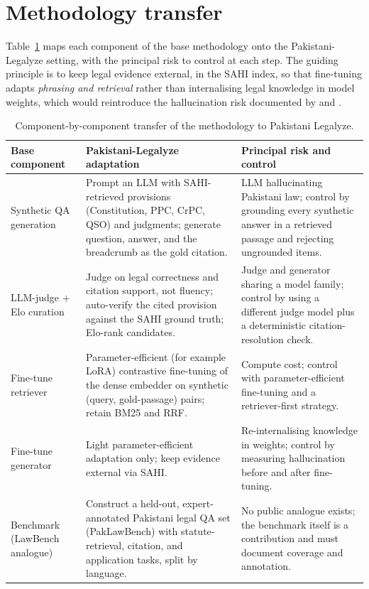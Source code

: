\documentclass[10pt,twocolumn]{article}
\renewcommand{\arraystretch}{1.25}
\begin{document}
\section{Methodology transfer}
\label{sec:rd-method}

Table~\ref{tab:rd-transfer} maps each component of the base methodology onto the Pakistani-Legalyze
setting, with the principal risk to control at each step. The guiding principle is to keep legal
evidence external, in the SAHI index, so that fine-tuning adapts \emph{phrasing and retrieval} rather
than internalising legal knowledge in model weights, which would reintroduce the hallucination risk
documented by \citet{dahl2024} and \citet{magesh2025}.

\begin{table}[t]
\centering
\caption{Component-by-component transfer of the \citet{ren2026} methodology to Pakistani Legalyze.}
\label{tab:rd-transfer}
\footnotesize
\setlength{\tabcolsep}{5pt}
\renewcommand{\arraystretch}{1.3}
\begin{tabularx}{\textwidth}{>{\raggedright\arraybackslash}p{3.0cm} >{\raggedright\arraybackslash}X >{\raggedright\arraybackslash}X}
\toprule
\textbf{Base component} & \textbf{Pakistani-Legalyze adaptation} & \textbf{Principal risk and control} \\
\midrule
Synthetic QA generation & Prompt an LLM with SAHI-retrieved provisions (Constitution, PPC, CrPC, QSO) and judgments; generate question, answer, and the breadcrumb as the gold citation. & LLM hallucinating Pakistani law; control by grounding every synthetic answer in a retrieved passage and rejecting ungrounded items. \\
LLM-judge + Elo curation & Judge on legal correctness and citation support, not fluency; auto-verify the cited provision against the SAHI ground truth; Elo-rank candidates. & Judge and generator sharing a model family; control by using a different judge model plus a deterministic citation-resolution check. \\
Fine-tune retriever & Parameter-efficient (for example LoRA) contrastive fine-tuning of the dense embedder on synthetic (query, gold-passage) pairs; retain BM25 and RRF. & Compute cost; control with parameter-efficient fine-tuning and a retriever-first strategy. \\
Fine-tune generator & Light parameter-efficient adaptation only; keep evidence external via SAHI. & Re-internalising knowledge in weights; control by measuring hallucination before and after fine-tuning. \\
Benchmark (LawBench analogue) & Construct a held-out, expert-annotated Pakistani legal QA set (PakLawBench) with statute-retrieval, citation, and application tasks, split by language. & No public analogue exists; the benchmark itself is a contribution and must document coverage and annotation. \\
\bottomrule
\end{tabularx}
\end{table}
\end{document}
